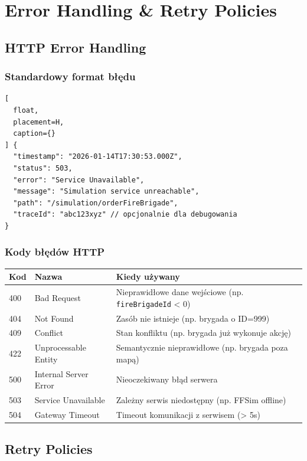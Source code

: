 \section{Error Handling \& Retry Policies}

\subsection{HTTP Error Handling}

\subsubsection{Standardowy format błędu}

\begin{lstlisting}[
  float,
  placement=H,
  caption={}
] {
  "timestamp": "2026-01-14T17:30:53.000Z",
  "status": 503,
  "error": "Service Unavailable",
  "message": "Simulation service unreachable",
  "path": "/simulation/orderFireBrigade",
  "traceId": "abc123xyz" // opcjonalnie dla debugowania
}
\end{lstlisting}

\subsubsection{Kody błędów HTTP}

\begin{longtable}{|l|l|p{6cm}|}
\hline
\textbf{Kod} & \textbf{Nazwa} & \textbf{Kiedy używany} \\
\hline
400 & Bad Request & Nieprawidłowe dane wejściowe (np. \texttt{fireBrigadeId} < 0) \\
\hline
404 & Not Found & Zasób nie istnieje (np. brygada o ID=999) \\
\hline
409 & Conflict & Stan konfliktu (np. brygada już wykonuje akcję) \\
\hline
422 & Unprocessable Entity & Semantycznie nieprawidłowe (np. brygada poza mapą) \\
\hline
500 & Internal Server Error & Nieoczekiwany błąd serwera \\
\hline
503 & Service Unavailable & Zależny serwis niedostępny (np. FFSim offline) \\
\hline
504 & Gateway Timeout & Timeout komunikacji z serwisem (> 5s) \\
\hline
\end{longtable}

\subsection{Retry Policies}

